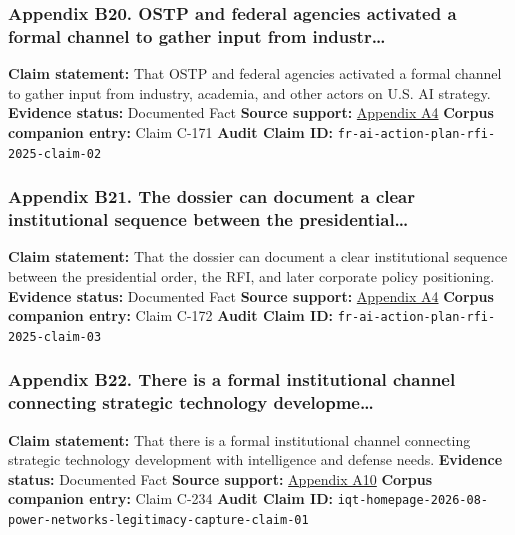 \documentclass[
  american,
  11pt,
  letterpaper,
]{article}
\begin{document}
\subsubsection{Appendix B20. OSTP and federal agencies activated a
formal channel to gather input from
industr\ldots{}}\label{appendix-b20-ostp-and-federal-agencies-activated-a-formal-channel-to-gather-input-from-industr}

\textbf{Claim statement:} That OSTP and federal agencies activated a
formal channel to gather input from industry, academia, and other actors
on U.S. AI strategy. \textbf{Evidence status:} Documented Fact
\textbf{Source support:}
\hyperref[appendix-a4-request-for-information-on-the-development-of-an-artificial-intelligence-ai-action-plan]{Appendix
A4} \textbf{Corpus companion entry:} Claim C-171 \textbf{Audit Claim
ID:} \texttt{fr-ai-action-plan-rfi-2025-claim-02}

\subsubsection{Appendix B21. The dossier can document a clear
institutional sequence between the
presidential\ldots{}}\label{appendix-b21-the-dossier-can-document-a-clear-institutional-sequence-between-the-presidential}

\textbf{Claim statement:} That the dossier can document a clear
institutional sequence between the presidential order, the RFI, and
later corporate policy positioning. \textbf{Evidence status:} Documented
Fact \textbf{Source support:}
\hyperref[appendix-a4-request-for-information-on-the-development-of-an-artificial-intelligence-ai-action-plan]{Appendix
A4} \textbf{Corpus companion entry:} Claim C-172 \textbf{Audit Claim
ID:} \texttt{fr-ai-action-plan-rfi-2025-claim-03}

\subsubsection{Appendix B22. There is a formal institutional channel
connecting strategic technology
developme\ldots{}}\label{appendix-b22-there-is-a-formal-institutional-channel-connecting-strategic-technology-developme}

\textbf{Claim statement:} That there is a formal institutional channel
connecting strategic technology development with intelligence and
defense needs. \textbf{Evidence status:} Documented Fact \textbf{Source
support:} \hyperref[appendix-a10-in-q-tel]{Appendix A10} \textbf{Corpus
companion entry:} Claim C-234 \textbf{Audit Claim ID:}
\texttt{iqt-homepage-2026-08-power-networks-legitimacy-capture-claim-01}
\end{document}
